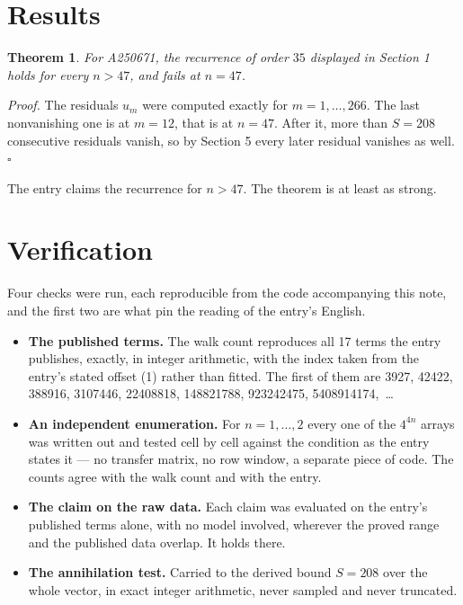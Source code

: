 \documentclass[11pt]{article}
\newtheorem{theorem}{Theorem}
\theoremstyle{definition}
\begin{document}
\section{Results}

\begin{theorem} For A250671, the recurrence of order $35$ displayed in Section 1 holds for every $n > 47$, and fails at $n = 47$.\end{theorem}

{\itshape Proof.} The residuals $u_m$ were computed exactly for $m = 1,\dots,266$. The last nonvanishing one is at $m = 12$, that is at $n = 47$. After it, more than $S = 208$ consecutive residuals vanish, so by Section 5 every later residual vanishes as well. $\square$

The entry claims the recurrence for $n > 47$. The theorem is at least as strong.

\section{Verification}

Four checks were run, each reproducible from the code accompanying this note, and the first two are what pin the reading of the entry's English.

\begin{itemize}

\item {\bfseries The published terms.} The walk count reproduces all 17 terms the entry publishes, exactly, in integer arithmetic, with the index taken from the entry's stated offset (1) rather than fitted. The first of them are 3927, 42422, 388916, 3107446, 22408818, 148821788, 923242475, 5408914174,~\dots

\item {\bfseries An independent enumeration.} For $n = 1,\dots,2$ every one of the $4^{4n}$ arrays was written out and tested cell by cell against the condition as the entry states it --- no transfer matrix, no row window, a separate piece of code. The counts agree with the walk count and with the entry.

\item {\bfseries The claim on the raw data.} Each claim was evaluated on the entry's published terms alone, with no model involved, wherever the proved range and the published data overlap. It holds there.

\item {\bfseries The annihilation test.} Carried to the derived bound $S = 208$ over the whole vector, in exact integer arithmetic, never sampled and never truncated.

\end{itemize}
\end{document}
